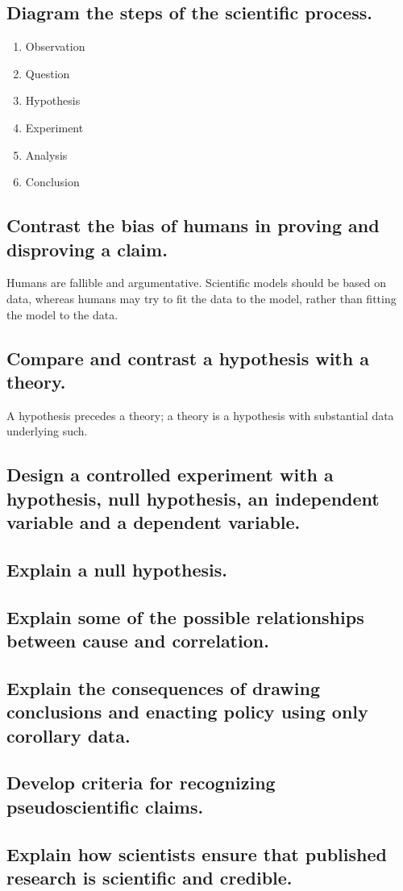 \subsection{Diagram the steps of the scientific process.}
\begin{enumerate}
    \item Observation
    \item Question
    \item Hypothesis
    \item Experiment
    \item Analysis
    \item Conclusion
\end{enumerate}

\subsection{Contrast the bias of humans in proving and disproving a claim.}
Humans are fallible and argumentative. Scientific models should be based on data, whereas humans may try to fit the data to the model, rather than fitting the model to the data. 

\subsection{Compare and contrast a hypothesis with a theory.}

A hypothesis precedes a theory; a theory is a hypothesis with substantial data underlying such.


\subsection{Design a controlled experiment with a hypothesis, null hypothesis, an independent variable and a dependent variable.}


\subsection{Explain a null hypothesis.}
\subsection{Explain some of the possible relationships between cause and correlation. }
\subsection{Explain the consequences of drawing conclusions and enacting policy using only corollary data.}
\subsection{Develop criteria for recognizing pseudoscientific claims.}
\subsection{Explain how scientists ensure that published research is scientific and credible.}
